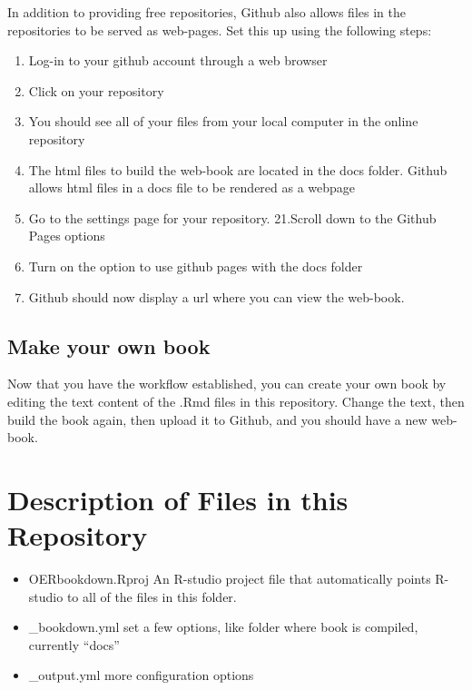 \documentclass[]{book}
\providecommand{\tightlist}{%
  \setlength{\itemsep}{0pt}\setlength{\parskip}{0pt}}
\theoremstyle{definition}
\theoremstyle{definition}
\theoremstyle{definition}
\theoremstyle{remark}
\begin{document}
In addition to providing free repositories, Github also allows files in
the repositories to be served as web-pages. Set this up using the
following steps:

\begin{enumerate}
\def\labelenumi{\arabic{enumi}.}
\setcounter{enumi}{15}
\tightlist
\item
  Log-in to your github account through a web browser
\item
  Click on your repository
\item
  You should see all of your files from your local computer in the
  online repository
\item
  The html files to build the web-book are located in the docs folder.
  Github allows html files in a docs file to be rendered as a webpage
\item
  Go to the settings page for your repository. 21.Scroll down to the
  Github Pages options
\item
  Turn on the option to use github pages with the docs folder
\item
  Github should now display a url where you can view the web-book.
\end{enumerate}

\subsection{Make your own book}\label{make-your-own-book}

Now that you have the workflow established, you can create your own book
by editing the text content of the .Rmd files in this repository. Change
the text, then build the book again, then upload it to Github, and you
should have a new web-book.

\section{Description of Files in this
Repository}\label{description-of-files-in-this-repository}

\begin{itemize}
\item
  OERbookdown.Rproj An R-studio project file that automatically points
  R-studio to all of the files in this folder.
\item
  \_bookdown.yml set a few options, like folder where book is compiled,
  currently ``docs''
\item
  \_output.yml more configuration options
\end{itemize}
\end{document}

